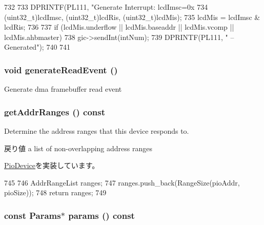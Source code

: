 \begin{DoxyCode}
732 {
733     DPRINTF(PL111, "Generate Interrupt: lcdImsc=0x%
734             (uint32_t)lcdImsc, (uint32_t)lcdRis, (uint32_t)lcdMis);
735     lcdMis = lcdImsc & lcdRis;
736 
737     if (lcdMis.underflow || lcdMis.baseaddr || lcdMis.vcomp || lcdMis.ahbmaster) 
      {
738         gic->sendInt(intNum);
739         DPRINTF(PL111, " -- Generated\n");
740     }
741 }
\end{DoxyCode}
\hypertarget{classPl111_ac97605847b61ff35749ab636c2cd1be0}{
\subsubsection[{generateReadEvent}]{\setlength{\rightskip}{0pt plus 5cm}void generateReadEvent ()}}
\label{classPl111_ac97605847b61ff35749ab636c2cd1be0}
Generate dma framebuffer read event \hypertarget{classPl111_a36cf113d5e5e091ebddb32306c098fae}{
\subsubsection[{getAddrRanges}]{ getAddrRanges () const}}
\label{classPl111_a36cf113d5e5e091ebddb32306c098fae}
Determine the address ranges that this device responds to.

\begin{DoxyReturn}{戻り値}
a list of non-\/overlapping address ranges 
\end{DoxyReturn}


\hyperlink{classPioDevice_a6e967f8921e80748eb2be35b6b481a7e}{PioDevice}を実装しています。


\begin{DoxyCode}
745 {
746     AddrRangeList ranges;
747     ranges.push_back(RangeSize(pioAddr, pioSize));
748     return ranges;
749 }
\end{DoxyCode}
\hypertarget{classPl111_acd3c3feb78ae7a8f88fe0f110a718dff}{
\subsubsection[{params}]{\setlength{\rightskip}{0pt plus 5cm}const {\bf Params}$\ast$ params () const}}
\label{classPl111_acd3c3feb78ae7a8f88fe0f110a718dff}


